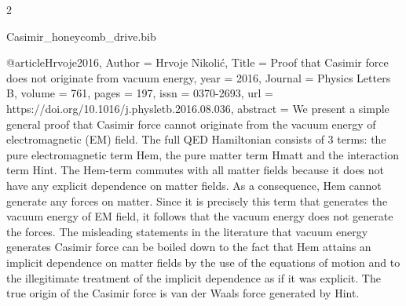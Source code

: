 \documentclass[twoside, 10pt]{article}
\def\myfilename{Casimir_honeycomb_drive}
\begin{document}
\begin{multicols}{2}
\begin{filecontents}{\myfilename.bib}

@article{Hrvoje2016,
    Author = {Hrvoje Nikolić},
    Title = {Proof that Casimir force does not originate from vacuum energy},
    year = {2016},
    Journal = {Physics Letters B},
    volume = {761},
    pages = {197},
    issn = {0370-2693},
    url = {https://doi.org/10.1016/j.physletb.2016.08.036},
    abstract = {We present a simple general proof that Casimir force cannot originate from the vacuum energy of electromagnetic (EM) field. The full QED Hamiltonian consists of 3 terms: the pure electromagnetic term Hem, the pure matter term Hmatt and the interaction term Hint. The Hem-term commutes with all matter fields because it does not have any explicit dependence on matter fields. As a consequence, Hem cannot generate any forces on matter. Since it is precisely this term that generates the vacuum energy of EM field, it follows that the vacuum energy does not generate the forces. The misleading statements in the literature that vacuum energy generates Casimir force can be boiled down to the fact that Hem attains an implicit dependence on matter fields by the use of the equations of motion and to the illegitimate treatment of the implicit dependence as if it was explicit. The true origin of the Casimir force is van der Waals force generated by Hint.}
}





\end{filecontents}
\end{multicols}
\end{document}
